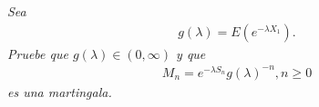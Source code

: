 \emph{
	Sea
	\begin{align}
		g(\lambda)=E(e^{- \lambda X_1}).
	\end{align} 
	Pruebe que $g(\lambda)\in (0,\infty)$ y que
	\begin{align}
		M_n=e^{-\lambda S_n}g(\lambda)^{-n},n\geq 0
	\end{align}
	es una martingala.
}